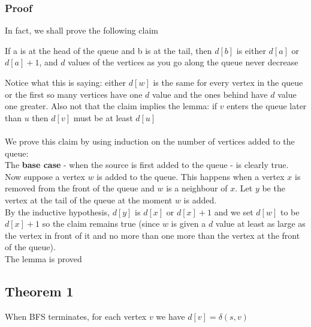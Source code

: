 \documentclass{article}[18pt]
\begin{document}
\subsubsection{Proof}
In fact, we shall prove the following claim
\begin{center}
	If a is at the head of the queue and b is at the tail, then $d[b]$ is either $d[a]$ or $d[a]+1$, and $d$ values of the vertices as you go along the queue never decrease
\end{center}
Notice what this is saying: either $d[w]$ is the same for every vertex in the queue or the first so many vertices have one $
d$ value and the ones behind have $d$ value one greater. Also not that the claim implies the lemma: if $v$ enters the queue later than $u$ then $d[v]$ must be at least $d[u]$\\
\\
We prove this claim by using induction on the number of vertices added to the queue:\\
The \textbf{base case} - when the source is first added to the queue - is clearly true.\\
Now suppose a vertex $w$ is added to the queue. This happens when a vertex $x$ is removed from the front of the queue and $w$ is a neighbour of $x$. Let $y$ be the vertex at the tail of the queue at the moment $w$ is added.\\
By the inductive hypothesis, $d[y]$ is $d[x]$ or $d[x]+1$ and we set $d[w]$ to be $d[x]+1$ so the claim remains true (since $w$ is given a $d$ value at least as large as the vertex in front of it and no more than one more than the vertex at the front of the queue).\\
The lemma is proved
\subsection{Theorem 1}
When BFS terminates, for each vertex $v$ we have $d[v]=\delta(s,v)$
\end{document}
